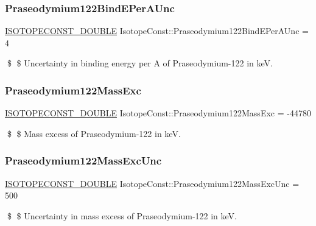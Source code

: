 \subsubsection{\texorpdfstring{Praseodymium122\+Bind\+E\+Per\+A\+Unc}{Praseodymium122BindEPerAUnc}}
{\footnotesize\ttfamily \mbox{\hyperlink{group___isotope_const-_macros_ga8f45a7272ce02c0b4c65c44636ed719a}{I\+S\+O\+T\+O\+P\+E\+C\+O\+N\+S\+T\+\_\+\+D\+O\+U\+B\+LE}} Isotope\+Const\+::\+Praseodymium122\+Bind\+E\+Per\+A\+Unc = 4}

\$ \$ Uncertainty in binding energy per A of Praseodymium-\/122 in keV. \mbox{\label{group___isotope_const-_praseodymium-_pr122_ga09ff9b33aa75c127eed0ec38f1dba43f}} 
\subsubsection{\texorpdfstring{Praseodymium122\+Mass\+Exc}{Praseodymium122MassExc}}
{\footnotesize\ttfamily \mbox{\hyperlink{group___isotope_const-_macros_ga8f45a7272ce02c0b4c65c44636ed719a}{I\+S\+O\+T\+O\+P\+E\+C\+O\+N\+S\+T\+\_\+\+D\+O\+U\+B\+LE}} Isotope\+Const\+::\+Praseodymium122\+Mass\+Exc = -\/44780}

\$ \$ Mass excess of Praseodymium-\/122 in keV. \mbox{\label{group___isotope_const-_praseodymium-_pr122_ga6f313cb7f060a4c050f80ffabbf68358}} 
\subsubsection{\texorpdfstring{Praseodymium122\+Mass\+Exc\+Unc}{Praseodymium122MassExcUnc}}
{\footnotesize\ttfamily \mbox{\hyperlink{group___isotope_const-_macros_ga8f45a7272ce02c0b4c65c44636ed719a}{I\+S\+O\+T\+O\+P\+E\+C\+O\+N\+S\+T\+\_\+\+D\+O\+U\+B\+LE}} Isotope\+Const\+::\+Praseodymium122\+Mass\+Exc\+Unc = 500}

\$ \$ Uncertainty in mass excess of Praseodymium-\/122 in keV. \mbox{\label{group___isotope_const-_praseodymium-_pr122_ga147f12991d2c270dca4d8aac8b0a1ce3}} 
